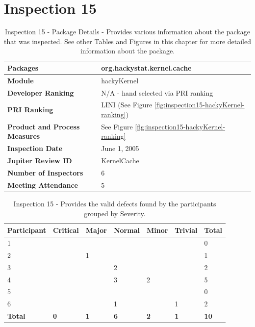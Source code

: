 \clearpage
\section{Inspection 15}
\label{appendix:section:inspection15}

\begin{table}[!h]
  \begin{center}
    \caption[Inspection 15 - Package Details]{Inspection 15 - Package Details 
      - Provides various information about the package that was
      inspected. See other Tables and Figures in this chapter for more
      detailed information about the package.}
    \label{tab:inspection-package-details-15}
    \begin{tabular}{|p{5.0cm}|p{8.0cm}|} \hline
{\bf Packages} & org.hackystat.kernel.cache \\ \hline
{\bf Module} & hackyKernel \\ \hline
{\bf Developer Ranking} & N/A - hand selected via PRI ranking \\ \hline
{\bf PRI Ranking} & LINI (See Figure \ref{fig:inspection15-hackyKernel-ranking}) \\ \hline
{\bf Product and Process Measures} & See Figure \ref{fig:inspection15-hackyKernel-ranking} \\ \hline
{\bf Inspection Date} & June 1, 2005 \\ \hline
{\bf Jupiter Review ID} & KernelCache \\ \hline
{\bf Number of Inspectors} & 6 \\ \hline
{\bf Meeting Attendance} & 5 \\ \hline
    \end{tabular}
  \end{center}
\end{table}

\begin{table}[!h]
  \begin{center}
    \caption[Inspection 15 - Results by Severity]{Inspection 15
      - Provides the valid defects found by the participants grouped by
      Severity.}
    \label{tab:inspection-results-15}
    \begin{tabular}{|p{2.0cm}|p{1.5cm}|p{1.5cm}|p{1.5cm}|p{1.5cm}|p{1.5cm}|p{1.5cm}|} \hline
{\bf Participant} & {\bf Critical} & {\bf Major} 
& {\bf Normal} & {\bf Minor} & {\bf Trivial} & {\bf Total} \\ \hline
1 &   &   &   &   &   & 0 \\ \hline
2 &   & 1 &   &   &   & 1 \\ \hline
3 &   &   & 2 &   &   & 2 \\ \hline
4 &   &   & 3 & 2 &   & 5 \\ \hline
5 &   &   &   &   &   & 0 \\ \hline
6 &   &   & 1 &   & 1 & 2 \\ \hline
{\bf Total} & {\bf 0} & {\bf 1} & {\bf 6} & {\bf 2} & {\bf 1} & {\bf 10} \\ \hline
    \end{tabular}
  \end{center}
\end{table}

